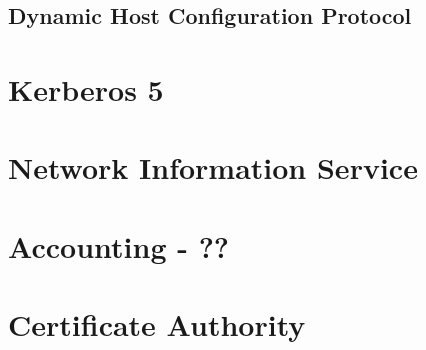 
\subsection{Dynamic Host Configuration Protocol}


\section{Kerberos 5}


\section{Network Information Service}


\section{Accounting - ??}


\section{Certificate Authority}

